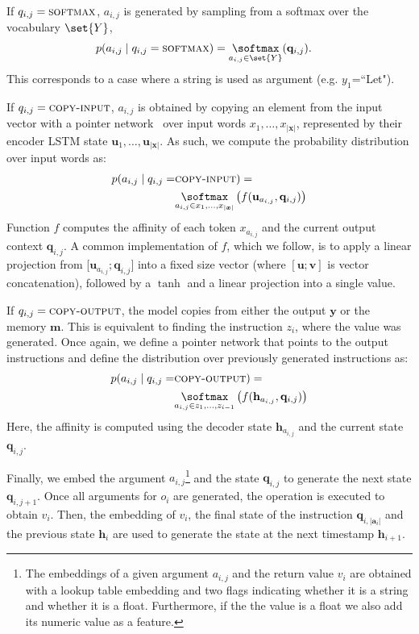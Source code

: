 \begin{itemizesquish}
\item If $q_{i,j} = \textsc{softmax}$, $a_{i,j}$ is generated by sampling from a softmax over the vocabulary $\set{Y}$,
\begin{align*}
\small
p(a_{i,j}&\mid q_{i,j}=\textsc{softmax})=\underset{a_{i,j} \in \set{Y}}\softmax(\mathbf{q}_{i,j}).
\end{align*}
This corresponds to a case where a string is used as argument (e.g. $y_1$=``Let"). 
\item If $q_{i,j} = \textsc{copy-input}$, $a_{i,j}$ is obtained by copying an element from the input vector with a pointer network~\cite{NIPS2015_5866} over input words $x_1,\ldots,x_{|\boldsymbol{x}|}$, represented by their encoder LSTM state $\mathbf{u}_1,\ldots,\mathbf{u}_{|\boldsymbol{x}|}$. As such, we compute the probability distribution over input words as:
\begin{align}
\label{copy-mec}
p(a_{i,j} \mid q_{i,j} =& \textsc{copy-input}) = \\ 
&\underset{a_{i,j} \in x_1,\ldots,x_{|\boldsymbol{x}|}}\softmax\left(f(\mathbf{u}_{a_{i,j}},\mathbf{q}_{i,j})\right)\nonumber
\end{align}
Function $f$ computes the affinity of each token $x_{a_{i,j}}$ and the current
output context $\mathbf{q}_{i,j}$. A common implementation of $f$, which we follow, is to apply a
linear projection from [$\mathbf{u}_{a_{i,j}};\mathbf{q}_{i,j}]$ into a fixed size vector (where $[\mathbf{u};\mathbf{v}]$ is vector concatenation), followed by a $\tanh$ and a linear projection into a single value.
\item If $q_{i,j} = \textsc{copy-output}$, the model copies from either the output $\boldsymbol{y}$ or the memory $\boldsymbol{m}$. This is equivalent to finding the instruction $z_i$, where the value was generated. Once again, we define a pointer network that points to the output instructions and define the distribution over previously generated instructions as:
\begin{align*}
p(a_{i,j} \mid q_{i,j} =& \textsc{copy-output}) =\\ 
&\underset{a_{i,j} \in z_1,\ldots,z_{i-1}}\softmax\left(f(\mathbf{h}_{a_{i,j}},\mathbf{q}_{i,j})\right)
\end{align*}
Here, the affinity is computed using the decoder state $\mathbf{h}_{a_{i,j}}$ and the current state $\mathbf{q}_{i,j}$. 
\end{itemizesquish}

Finally, we embed the argument $a_{i,j}$\footnote{
The embeddings of a given argument $a_{i,j}$ and the return value $v_{i}$ are obtained with a lookup table embedding and two flags indicating whether it is a string and whether it is a float. Furthermore, if the the value is a float we also add its numeric value as a feature. 
}
and the state $\mathbf{q}_{i,j}$ to generate the next state $\mathbf{q}_{i,j+1}$. Once all arguments for $o_i$ are generated, the operation is executed to obtain $v_i$. 
Then, the embedding of $v_i$, the final state of the instruction $\mathbf{q}_{i,|\boldsymbol{a}_i|}$ and the previous state $\mathbf{h}_i$ are used to generate the state at the next timestamp $\mathbf{h}_{i+1}$.


